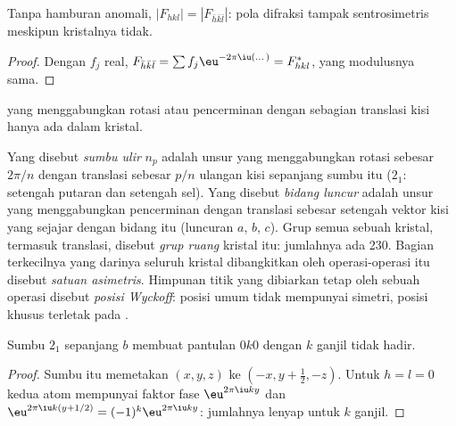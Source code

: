 \begin{proposition}\label{prop:b3:x-ray-diffraction:friedel}
Tanpa hamburan anomali, $|F_{hkl}| = |F_{\bar h\bar k\bar l}|$: pola difraksi
tampak sentrosimetris meskipun kristalnya tidak.
\end{proposition}

\begin{proof}
Dengan $f_j$ real, $F_{\bar h\bar k\bar l} = \sum f_j\eu^{-2\pi\iu(\dots)} = F_{hkl}^*$,
yang modulusnya sama.
\end{proof}

 yang menggabungkan rotasi atau pencerminan dengan
sebagian translasi kisi hanya ada dalam kristal.

\begin{definition}\label{def:b3:x-ray-diffraction:space-group}
Yang disebut \emph{sumbu ulir} $n_p$ adalah unsur yang
menggabungkan rotasi sebesar $2\pi/n$ dengan translasi sebesar $p/n$ ulangan
kisi sepanjang sumbu itu ($2_1$: setengah putaran dan setengah sel). Yang
disebut \emph{bidang luncur} adalah unsur yang
menggabungkan pencerminan dengan translasi sebesar setengah vektor kisi yang
sejajar dengan bidang itu (luncuran $a$, $b$, $c$). Grup semua 
sebuah kristal, termasuk translasi, disebut \emph{grup ruang}
kristal itu: jumlahnya ada 230. Bagian terkecilnya yang darinya seluruh
kristal dibangkitkan oleh operasi-operasi itu disebut \emph{satuan
asimetris}. Himpunan titik yang dibiarkan tetap oleh
sebuah  operasi disebut \emph{posisi Wyckoff}:
posisi umum tidak mempunyai simetri, posisi khusus terletak pada .
\end{definition}

\begin{proposition}\label{prop:b3:x-ray-diffraction:screw-absence}
Sumbu $2_1$ sepanjang $b$ membuat pantulan $0k0$ dengan $k$ ganjil tidak hadir.
\end{proposition}

\begin{proof}
Sumbu itu memetakan $(x, y, z)$ ke $(-x, y + \frac12, -z)$. Untuk $h = l = 0$ kedua
atom mempunyai faktor fase $\eu^{2\pi\iu ky}$ dan
$\eu^{2\pi\iu k(y + 1/2)} = (-1)^k\eu^{2\pi\iu ky}$: jumlahnya lenyap untuk $k$
ganjil.
\end{proof}

